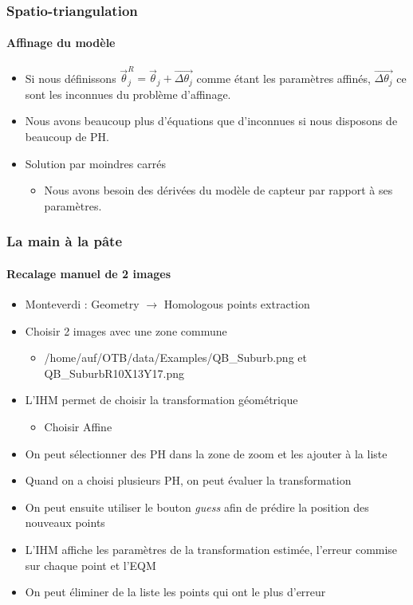 \documentclass[compress,handout]{beamer}
\begin{document}
\begin{frame}
  \frametitle{Spatio-triangulation}
  \framesubtitle{Affinage du modèle}
  \begin{itemize}
    \item Si nous définissons $\vec\theta_j^R = \vec\theta_j +
    \vec{\Delta\theta_j}$ comme étant les paramètres affinés,
    $\vec{\Delta\theta_j}$ ce sont les inconnues du problème d'affinage.
    \item Nous avons beaucoup plus d'équations que d'inconnues si nous
      disposons de beaucoup de PH.
    \item Solution par moindres carrés
      \begin{itemize}
	\item Nous avons besoin des dérivées du modèle de capteur par
          rapport à ses paramètres.
      \end{itemize}
  \end{itemize}
  
\end{frame}

\begin{frame}
  \frametitle{La main à la pâte}
  \framesubtitle{Recalage manuel de 2 images}
\vspace*{-0.6cm}
{\scriptsize
  \begin{itemize}
  \item Monteverdi : Geometry $\rightarrow$ Homologous points extraction
  \item Choisir 2 images avec une zone commune
    \begin{itemize}
    \item /home/auf/OTB/data/Examples/QB\_Suburb.png et QB\_SuburbR10X13Y17.png
    \end{itemize}
  \item L'IHM permet de choisir la transformation géométrique
    \begin{itemize}
    \item Choisir Affine
    \end{itemize}
  \item On peut sélectionner des PH dans la zone de zoom et les
    ajouter à la liste
  \item Quand on a choisi plusieurs PH, on peut évaluer la transformation
  \item On peut ensuite utiliser le bouton {\em guess} afin de prédire
    la position des nouveaux points
  \item L'IHM affiche les paramètres de la transformation estimée,
    l'erreur commise sur chaque point et l'EQM
  \item On peut éliminer de la liste les points qui ont le plus
    d'erreur
  \end{itemize}
  }
\end{frame}
\end{document}
